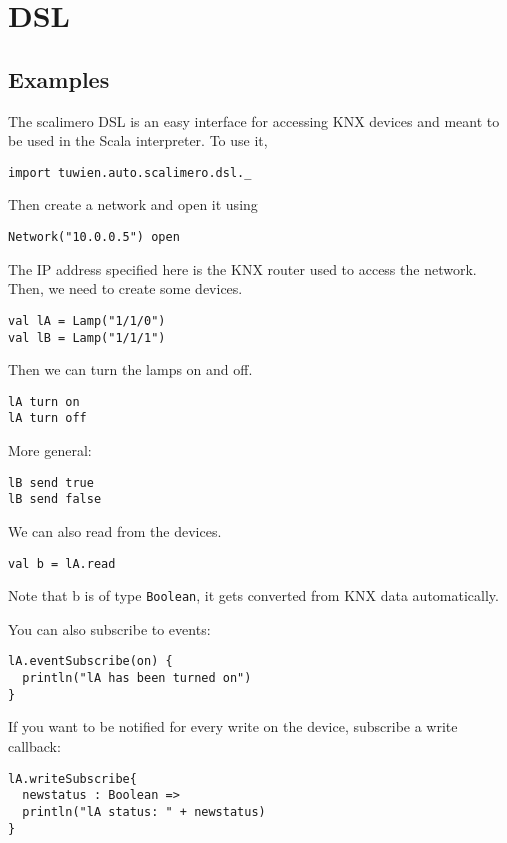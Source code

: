 \chapter{DSL}

\section{Examples}
The scalimero DSL is an easy interface for accessing KNX devices and meant to be used in the Scala interpreter. To use it,
\begin{lstlisting}
import tuwien.auto.scalimero.dsl._
\end{lstlisting}
Then create a network and open it using
\begin{lstlisting}
Network("10.0.0.5") open
\end{lstlisting}
The IP address specified here is the KNX router used to access the network. Then, we need to create some devices.
\begin{lstlisting}
val lA = Lamp("1/1/0")
val lB = Lamp("1/1/1")
\end{lstlisting}
Then we can turn the lamps on and off.
\begin{lstlisting}
lA turn on
lA turn off
\end{lstlisting}
More general:
\begin{lstlisting}
lB send true
lB send false
\end{lstlisting}
We can also read from the devices.
\begin{lstlisting}
val b = lA.read
\end{lstlisting}
Note that b is of type \lstinline!Boolean!, it gets converted from KNX data automatically.

You can also subscribe to events:
\begin{lstlisting}
lA.eventSubscribe(on) {
  println("lA has been turned on")
}
\end{lstlisting}

If you want to be notified for every write on the device, subscribe a write callback:
\begin{lstlisting}
lA.writeSubscribe{
  newstatus : Boolean =>
  println("lA status: " + newstatus)
}
\end{lstlisting}
